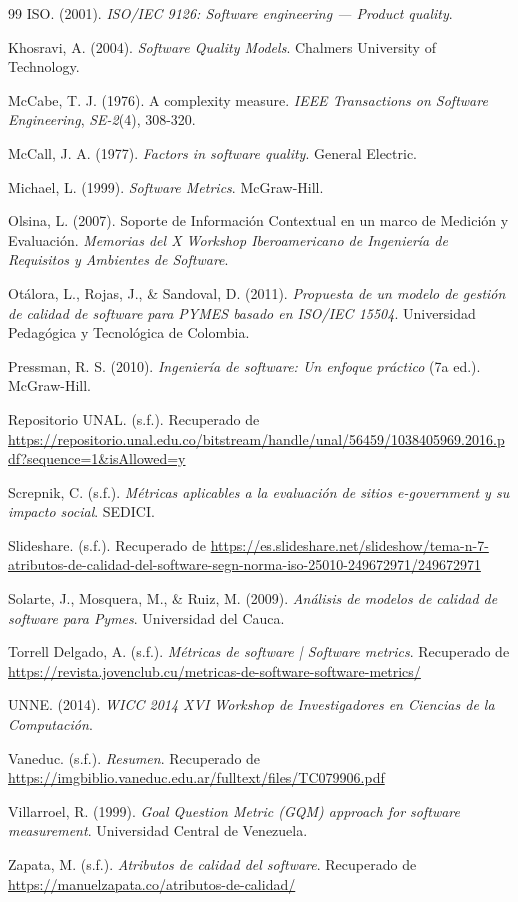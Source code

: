 \documentclass[11pt]{article}
\begin{document}
\begin{thebibliography}{99}
 ISO. (2001). \textit{ISO/IEC 9126: Software engineering — Product quality}.

 Khosravi, A. (2004). \textit{Software Quality Models}. Chalmers University of Technology.

 McCabe, T. J. (1976). A complexity measure. \textit{IEEE Transactions on Software Engineering}, \textit{SE-2}(4), 308-320.

 McCall, J. A. (1977). \textit{Factors in software quality}. General Electric.

 Michael, L. (1999). \textit{Software Metrics}. McGraw-Hill.

 Olsina, L. (2007). Soporte de Información Contextual en un marco de Medición y Evaluación. \textit{Memorias del X Workshop Iberoamericano de Ingeniería de Requisitos y Ambientes de Software}.

 Otálora, L., Rojas, J., \& Sandoval, D. (2011). \textit{Propuesta de un modelo de gestión de calidad de software para PYMES basado en ISO/IEC 15504}. Universidad Pedagógica y Tecnológica de Colombia.

 Pressman, R. S. (2010). \textit{Ingeniería de software: Un enfoque práctico} (7a ed.). McGraw-Hill.

 Repositorio UNAL. (s.f.). Recuperado de \url{https://repositorio.unal.edu.co/bitstream/handle/unal/56459/1038405969.2016.pdf?sequence=1&isAllowed=y}

 Screpnik, C. (s.f.). \textit{Métricas aplicables a la evaluación de sitios e-government y su impacto social}. SEDICI.

 Slideshare. (s.f.). Recuperado de \url{https://es.slideshare.net/slideshow/tema-n-7-atributos-de-calidad-del-software-segn-norma-iso-25010-249672971/249672971}

 Solarte, J., Mosquera, M., \& Ruiz, M. (2009). \textit{Análisis de modelos de calidad de software para Pymes}. Universidad del Cauca.

 Torrell Delgado, A. (s.f.). \textit{Métricas de software | Software metrics}. Recuperado de \url{https://revista.jovenclub.cu/metricas-de-software-software-metrics/}

 UNNE. (2014). \textit{WICC 2014 XVI Workshop de Investigadores en Ciencias de la Computación}.

 Vaneduc. (s.f.). \textit{Resumen}. Recuperado de \url{https://imgbiblio.vaneduc.edu.ar/fulltext/files/TC079906.pdf}

 Villarroel, R. (1999). \textit{Goal Question Metric (GQM) approach for software measurement}. Universidad Central de Venezuela.

 Zapata, M. (s.f.). \textit{Atributos de calidad del software}. Recuperado de \url{https://manuelzapata.co/atributos-de-calidad/}

\end{thebibliography}
\end{document}
